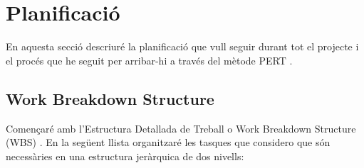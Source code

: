 \documentclass[10pt,a4paper,twocolumn,twoside]{article}
\begin{document}
\section{Planificació}

En aquesta secció descriuré la planificació que vull seguir durant tot el
projecte i el procés que he seguit per arribar-hi a través del mètode
PERT \cite{PERT}.

\subsection{Work Breakdown Structure}
Començaré amb l'Estructura Detallada de Treball o Work Breakdown Structure (WBS)
\cite{WBS}. En la següent llista organitzaré les tasques que considero que són 
necessàries en una estructura jeràrquica de dos nivells:
\end{document}
